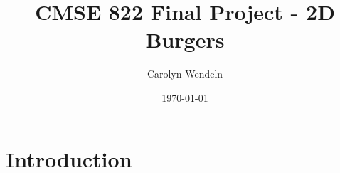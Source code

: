 \documentclass{article}
\title{CMSE 822 Final Project - 2D Burgers}
\author{Carolyn Wendeln}
\date{\today}
\begin{document}
\maketitle

\section{Introduction}
\end{document}
